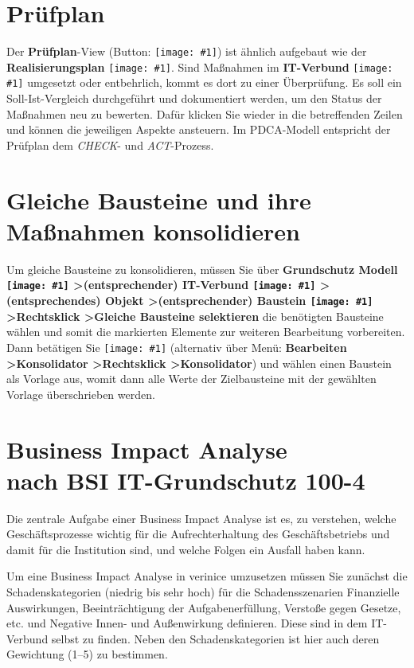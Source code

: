 \documentclass[a4paper,10pt]{book}
\newcommand{\icon}[1]{\texttt{[image: \#1]}}
\begin{document}
\section{Prüfplan}
Der \textbf{Prüfplan}-View (Button: \icon{Icon/page_find.png}) ist ähnlich aufgebaut wie der \textbf{Realisierungsplan} \icon{Icon/Okay.png}. Sind Maßnahmen im \textbf{IT-Verbund} \icon{Icon/GS_Modell.png} umgesetzt oder entbehrlich, kommt es dort zu einer Überprüfung.  Es soll ein Soll-Ist-Vergleich durchgeführt und dokumentiert werden, um den Status der Maßnahmen neu zu bewerten. Dafür klicken Sie wieder in die betreffenden Zeilen und können die jeweiligen Aspekte ansteuern. Im PDCA-Modell entspricht der Prüfplan dem \textit{CHECK}- und \textit{ACT}-Prozess.

\section{Gleiche Bausteine und ihre Maßnahmen konsolidieren}
Um gleiche Bausteine zu konsolidieren, müssen Sie über \textbf{Grundschutz Modell \icon{Icon/GS_Modell.png} \textgreater (entsprechender) IT-Verbund \icon{Icon/GS_Modell.png} \textgreater (entsprechendes) Objekt \textgreater (entsprechender) Baustein \icon{Icon/Baustein.png} \textgreater Rechtsklick \textgreater Gleiche Bausteine selektieren} die benötigten Bausteine wählen und somit die markierten Elemente zur weiteren Bearbeitung vorbereiten. Dann betätigen Sie \icon{Icon/Konsolidator.png} (alternativ über Menü: \textbf{Bearbeiten \textgreater Konsolidator \textgreater Rechtsklick \textgreater Konsolidator}) und wählen einen Baustein als Vorlage aus, womit dann alle Werte der Zielbausteine mit der gewählten Vorlage überschrieben werden.


\section{Business Impact Analyse\\ nach BSI IT-Grund\-schutz 100-4}
\label{sec:business-impact-analyse-nach-bsi-it-grundschutz-100-4}

Die zentrale Aufgabe einer Business Impact Analyse ist es, zu verstehen, welche
Geschäftsprozesse wichtig für die Aufrechterhaltung des Geschäftsbetriebs und
damit für die Institution sind, und welche Folgen ein Ausfall haben kann.

Um eine Business Impact Analyse in verinice umzusetzen müssen Sie zunächst die
Schadenskategorien (niedrig bis sehr hoch) für die Schadensszenarien Finanzielle
Auswirkungen, Beeinträchtigung der Aufgabenerfüllung, Verstoße gegen Gesetze,
etc. und Negative Innen- und Außenwirkung definieren. Diese sind in dem
IT-Verbund selbst zu finden. Neben den Schadenskategorien ist hier auch
deren Gewichtung (1--5) zu bestimmen.
\end{document}
